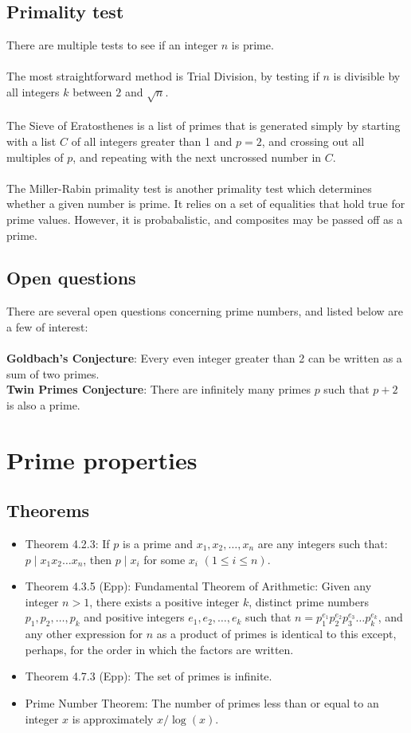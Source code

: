 \documentclass[a4paper]{article}
\begin{document}
\subsection{Primality test}
There are multiple tests to see if an integer $n$ is prime.\\ \\
The most straightforward method is Trial Division, by testing if $n$ is divisible by all integers $k$ between $2$ and $\sqrt{n}$.\\ \\
The Sieve of Eratosthenes is a list of primes that is generated simply by starting with a list $C$ of all integers greater than 1 and $p=2$, and crossing out all multiples of $p$, and repeating with the next uncrossed number in $C$.\\ \\ 
The Miller-Rabin primality test is another primality test which determines whether a given number is prime. It relies on a set of equalities that hold true for prime values. However, it is probabalistic, and composites may be passed off as a prime.

\subsection{Open questions}
There are several open questions concerning prime numbers, and listed below are a few of interest:\\ \\
\textbf{Goldbach's Conjecture}: Every even integer greater than 2 can be written as a sum of two primes.\\
\textbf{Twin Primes Conjecture}: There are infinitely many primes $p$ such that $p+2$ is also a prime.


\appendix
\section{Prime properties}
\subsection{Theorems}
\begin{itemize}
	\item[] Theorem 4.2.3: If $p$ is a prime and $x_1, x_2,\dots, x_n$ are any integers such that: $p\mid x_1x_2\dots x_n$, then $p\mid x_i$ for some $x_i$ $(1\le i \le n)$.
	\item[] Theorem 4.3.5 (Epp): Fundamental Theorem of Arithmetic: Given any integer $n>1$, there exists a positive integer $k$, distinct prime numbers $p_1,p_2,\dots,p_k$ and positive integers $e_1,e_2,\dots,e_k$ such that $n=p^{e_1}_{1}p^{e_2}_{2}p^{e_3}_{3}\dots p^{e_k}_{k}$, and any other expression for $n$ as a product of primes is identical to this except, perhaps, for the order in which the factors are written.
	\item[] Theorem 4.7.3 (Epp): The set of primes is infinite.
	\item[] Prime Number Theorem: The number of primes less than or equal to an integer $x$ is approximately $x /\log(x)$.
\end{itemize}
\end{document}
